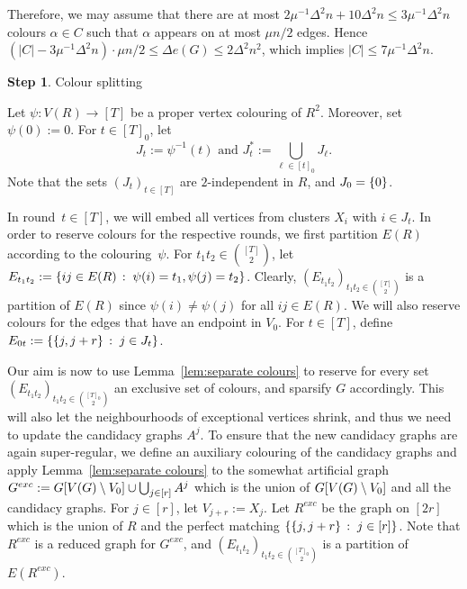 \documentclass[10pt]{amsart}
\theoremstyle{definition}
\theoremstyle{claimstyle}
\theoremstyle{stepstyle}
\newtheorem{step}{Step}
\numberwithin{equation}{section}
\begin{document}
Therefore, we may assume that there are at most $2\mu^{-1}\Delta^2 n+ 10\Delta^2 n \leq 3\mu^{-1}\Delta^2 n$
colours $\alpha\in C$
such that $\alpha$ appears on at most $\mu n/2$ edges.
Hence $(|C|-3\mu^{-1}\Delta^2 n)\cdot\mu n/2 \leq \Delta e(G)\le 2\Delta^2 n^2$,
which implies $|C|\leq 7\mu^{-1}\Delta^2 n$.




\begin{NoHyper}
\begin{step} \label{step:colour splitting}
Colour splitting
\end{step}
\end{NoHyper}


Let $\psi\colon V(R) \to [T]$ be a proper vertex colouring of $R^2$. Moreover, set $\psi(0):=0$. For $t \in[T]_0$, let
$$J_t:=\psi^{-1}(t) \text{ and } J_t^\ast:=\bigcup_{\ell\in [t]_0}J_{\ell}.$$
Note that the sets $(J_t)_{t\in [T]}$ are $2$-independent in $R$, and $J_0=\{0\}$.

In round~$t\in [T]$, we will embed all vertices from clusters $X_i$ with $i\in J_t$.
In order to reserve colours for the respective rounds, we first partition $E(R)$ according to the colouring~$\psi$. For $t_1t_2\in \binom{[T]}{2}$, let $E_{t_1t_2}:=\{ij\in E(R)\,:\;\psi(i)=t_1,\psi(j)=t_2\}$.
Clearly, $(E_{t_1t_2})_{t_1t_2\in \binom{[T]}{2}}$ is a partition of $E(R)$ since $\psi(i)\neq \psi(j)$ for all $ij\in E(R)$. We will also reserve colours for the edges that have an endpoint in $V_0$. For $t\in [T]$, define $E_{0t}:=\{\{j,j+r\}\,:\;j \in J_t\}$.

Our aim is now to use Lemma~\ref{lem:separate colours} to reserve for every set $(E_{t_1t_2})_{t_1t_2\in \binom{[T]_0}{2}}$ an exclusive set of colours, and sparsify $G$ accordingly. This will also let the neighbourhoods of exceptional vertices shrink, and thus we need to update the candidacy graphs $A^j$. To ensure that the new candidacy graphs are again super-regular, we define an auxiliary colouring of the candidacy graphs and apply Lemma~\ref{lem:separate colours} to the somewhat artificial graph $G^{exc}:=G[V(G)\setminus V_0]\cup \bigcup_{j\in[r]}A^j$ which is the union of $G[V(G)\setminus V_0]$ and all the candidacy graphs. For $j\in[r]$, let $V_{j+r}:=X_j$. Let $R^{exc}$ be the graph on $[2r]$ which is the union of $R$ and the perfect matching $\{\{j,j+r\}\,:\;j\in [r]\}$. Note that $R^{exc}$ is a reduced graph for $G^{exc}$, and $(E_{t_1t_2})_{t_1t_2\in \binom{[T]_0}{2}}$ is a partition of $E(R^{exc})$.
\end{document}
